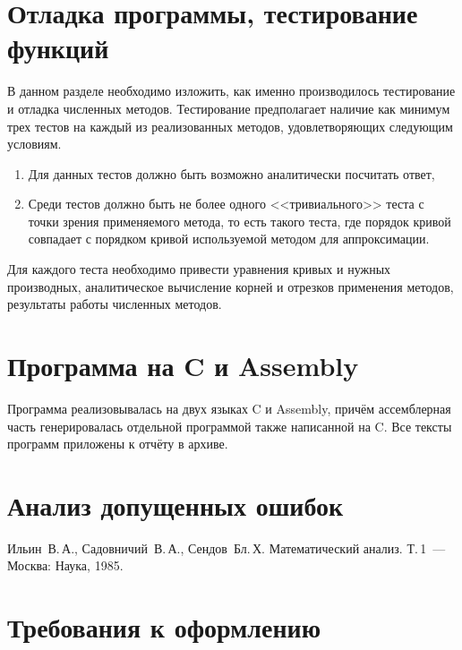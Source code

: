\documentclass[a4paper,12pt,titlepage,finall]{article}
\begin{document}
\section{Отладка программы, тестирование функций}

В данном разделе необходимо изложить, как именно производилось тестирование
и отладка численных методов. Тестирование предполагает наличие как минимум
трех тестов на каждый из реализованных методов, удовлетворяющих следующим
условиям.
\begin{enumerate}
\item Для данных тестов должно быть возможно аналитически посчитать ответ,
\item Среди тестов должно быть не более одного <<тривиального>> теста
    с точки зрения применяемого метода, то есть такого теста, где порядок
    кривой совпадает с порядком кривой используемой методом для аппроксимации.
\end{enumerate}

Для каждого теста необходимо привести уравнения кривых и нужных производных,
аналитическое вычисление корней и отрезков применения методов, результаты
работы численных методов.

\newpage

\section{Программа на C и Assembly}

Программа реализовывалась на двух языках C и Assembly, причём ассемблерная часть генерировалась отдельной программой также написанной на C. Все тексты программ приложены к отчёту в архиве. 
\newpage

\section{Анализ допущенных ошибок}

\newpage
\begin{raggedright}
\begin{thebibliography}{99}
 Ильин~В.\,А., Садовничий~В.\,А., Сендов~Бл.\,Х. Математический анализ. Т.\,1~---
    Москва: Наука, 1985.
\end{thebibliography}
\end{raggedright}

\newpage

\section*{Требования к оформлению}
\end{document}
